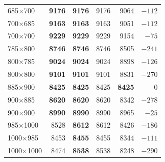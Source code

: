 \begin{table}[H]
\begin{tabular}{lrrrrr}
685$\times$700 & \textbf{9176} & \textbf{9176} & 9176 & 9064 & $-112$\\
700$\times$685 & \textbf{9163} & \textbf{9163} & 9163 & 9051 & $-112$\\
700$\times$700 & \textbf{9229} & \textbf{9229} & 9229 & 9154 & $-75$\\
785$\times$800 & \textbf{8746} & \textbf{8746} & 8746 & 8505 & $-241$\\
800$\times$785 & \textbf{9024} & \textbf{9024} & 9024 & 8898 & $-126$\\
800$\times$800 & \textbf{9101} & \textbf{9101} & 9101 & 8831 & $-270$\\
885$\times$900 & \textbf{8425} & \textbf{8425} & 8425 & \textbf{8425} & 0\\
900$\times$885 & \textbf{8620} & \textbf{8620} & 8620 & 8342 & $-278$\\
900$\times$900 & \textbf{8990} & \textbf{8990} & 8990 & 8965 & $-25$\\
985$\times$1000 & 8528 & \textbf{8612} & 8612 & 8426 & $-186$\\
1000$\times$985 & 8453 & \textbf{8455} & 8455 & 8344 & $-111$\\
1000$\times$1000 & 8474 & \textbf{8538} & 8538 & 8248 & $-290$\\
\bottomrule
\end{tabular}
\end{table}
